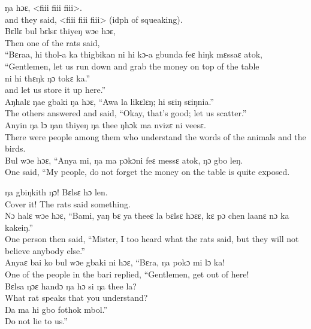 ŋa hɔɛ, <fiii fiii fiii>.\\
and they said, <fiii fiii fiii> (idph of squeaking).\\

Bɛllɛ bul bɛlsɛ thiyeŋ wɔe hɔɛ,\\
Then one of the rats said,\\

“Bɛraa, hi thol-a ka thigbikan ni hi kɔ-a gbunda feɛ hiŋk mɛssaɛ atok,\\
“Gentlemen, let us run down and grab the money on top of the table\\ 

ni hi thɛŋk ŋɔ tokɛ ka.”\\
and let us store it up here.”\\

Aŋhalɛ ŋae gbaki ŋa hɔɛ, “Awa la likɛlɛŋ; hi sɛiŋ sɛiŋnia.”\\
The others answered and said, “Okay, that’s good; let us scatter.”\\

Anyin ŋa lɔ ŋan thiyeŋ ŋa thee ŋhɔk ma nvizɛ ni veesɛ.\\
There were people among them who understand the words of the animals and the birds.\\

Bul wɔe hɔɛ, “Anya mi, ŋa ma pɔkɔni feɛ messɛ atok, ŋɔ gbo leŋ.\\ 
One said, “My people, do not forget the money on the table is quite exposed.\newpage

ŋa gbiŋkith ŋɔ! Bɛlsɛ hɔ len.\\
Cover it! The rats said something.\\

Nɔ halɛ wɔe hɔɛ, “Bami, yaŋ bɛ ya theeɛ la bɛlsɛ hɔɛɛ, kɛ pɔ chen laanɛ nɔ ka kakeiŋ.”\\
One person then said, “Mister, I too heard what the rats said, but they will not believe anybody else.”\\

Anyaɛ bai ko bul wɔe gbaki ni hɔɛ, “Bɛra, ŋa pokɔ mi lɔ ka!\\
One of the people in the bari replied, “Gentlemen, get out of here!\\

Bɛlsa ŋɔɛ handɔ ŋa hɔ si ŋa thee la?\\
What rat speaks that you understand?\\

Ŋa ma hi gbo fothok mbol.”\\
Do not lie to us.”\\

